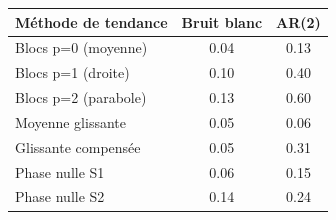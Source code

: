 \begin{tabular}{lcc}
\toprule
Méthode de tendance & Bruit blanc & AR(2) \\
\midrule
Blocs p=0 (moyenne) & 0.04 & 0.13 \\
Blocs p=1 (droite) & 0.10 & 0.40 \\
Blocs p=2 (parabole) & 0.13 & 0.60 \\
Moyenne glissante & 0.05 & 0.06 \\
Glissante compensée & 0.05 & 0.31 \\
Phase nulle S1 & 0.06 & 0.15 \\
Phase nulle S2 & 0.14 & 0.24 \\
\bottomrule
\end{tabular}
